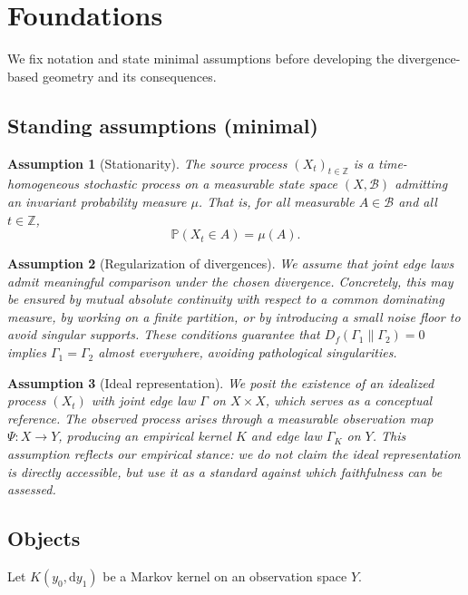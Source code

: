 \documentclass[11pt]{article}
\newtheorem{assumption}{Assumption}
\newcommand{\1}{\mathbf{1}}
\begin{document}
\medskip


\section{Foundations}
We fix notation and state minimal assumptions before developing the divergence-based geometry and its consequences.

\subsection{Standing assumptions (minimal)}
\begin{assumption}[Stationarity]
The source process $(X_t)_{t\in\mathbb{Z}}$ is a time-homogeneous stochastic process on a 
measurable state space $(X,\mathcal{B})$ admitting an invariant probability measure $\mu$. 
That is, for all measurable $A \in \mathcal{B}$ and all $t \in \mathbb{Z}$,
\[
\mathbb{P}(X_t \in A) = \mu(A).
\]
\end{assumption}

\begin{assumption}[Regularization of divergences]
We assume that joint edge laws admit meaningful comparison under the chosen divergence.  
Concretely, this may be ensured by mutual absolute continuity with respect to a common dominating measure, by working on a finite partition, or by introducing a small noise floor to avoid singular supports.  
These conditions guarantee that $D_f(\Gamma_1\|\Gamma_2)=0$ implies $\Gamma_1=\Gamma_2$ almost everywhere, avoiding pathological singularities.
\end{assumption}

\begin{assumption}[Ideal representation]
We posit the existence of an \emph{idealized process} $(X_t)$ with joint edge law $\Gamma$ on $X\times X$, which serves as a conceptual reference.  
The observed process arises through a measurable observation map $\Psi:X\to Y$, producing an empirical kernel $K$ and edge law $\Gamma_K$ on $Y$.  
This assumption reflects our empirical stance: we do not claim the ideal representation is directly accessible, but use it as a standard against which faithfulness can be assessed.
\end{assumption}

\subsection{Objects}
Let $K(y_0,\mathrm dy_1)$ be a Markov kernel on an observation space $Y$.
\end{document}
